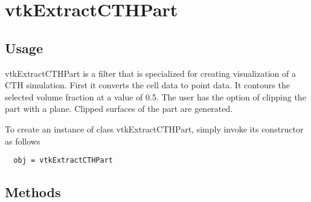 \section{vtkExtractCTHPart}

\subsection{Usage}

 vtkExtractCTHPart is a filter that is specialized for creating 
 visualization of a CTH simulation.  First it converts the cell data
 to point data.  It contours the selected volume fraction at a value
 of 0.5.  The user has the option of clipping the part with a plane.
 Clipped surfaces of the part are generated.

To create an instance of class vtkExtractCTHPart, simply
invoke its constructor as follows
\begin{verbatim}
  obj = vtkExtractCTHPart
\end{verbatim}
\subsection{Methods}

